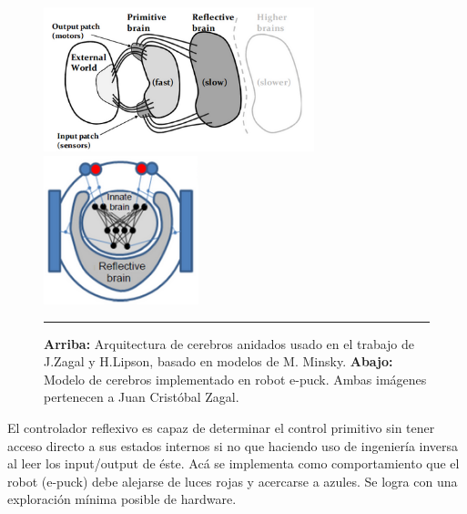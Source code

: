 \begin{figure}[htbp]
	\centering
		\includegraphics[width=0.7\textwidth]{./Figures/arquitectura_cerebro.png}
		\includegraphics[width=0.4\textwidth]{./Figures/automodelado_epuck.png}
		\rule{35em}{0.5pt}
	\caption[Automodelado]{\textbf{Arriba:} Arquitectura de cerebros anidados usado en el trabajo de J.Zagal y H.Lipson, basado en modelos de M. Minsky. \textbf{Abajo:} Modelo de cerebros implementado en robot e-puck. Ambas imágenes  pertenecen a Juan Cristóbal Zagal.}
	\label{fig:Automodelado}
\end{figure}

El controlador reflexivo es capaz de determinar el control primitivo sin tener acceso directo  a sus estados internos si no que haciendo uso de ingeniería inversa al leer los input/output de éste. Acá se implementa como comportamiento que el robot (e-puck) debe alejarse de luces rojas y acercarse a azules. Se logra con una exploración mínima posible de hardware.

